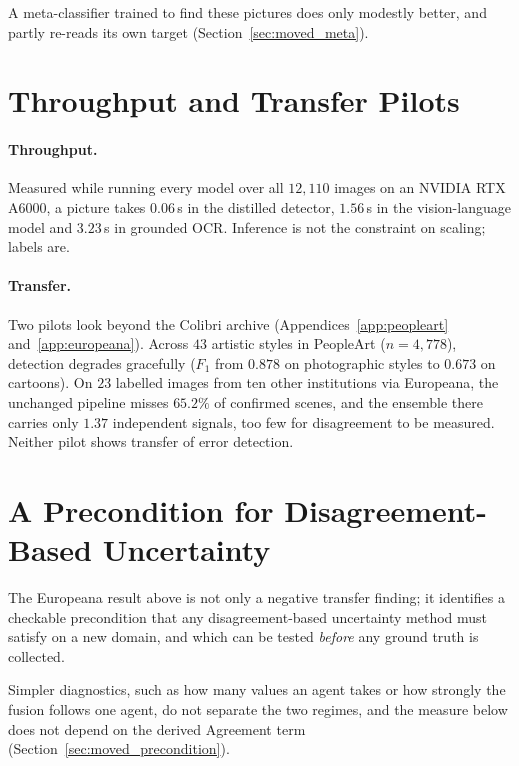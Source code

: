 \documentclass[12pt,a4paper]{report}
\begin{document}
A meta-classifier trained to find these pictures does only modestly better, and partly re-reads its own target (Section~\ref{sec:moved_meta}).

\section{Throughput and Transfer Pilots}
\label{sec:throughput_transfer}
\paragraph{Throughput.} Measured while running every model over all $12{,}110$ images on an NVIDIA RTX A6000, a picture takes $0.06$\,s in the distilled detector, $1.56$\,s in the vision-language model and $3.23$\,s in grounded OCR. Inference is not the constraint on scaling; labels are.

\paragraph{Transfer.} Two pilots look beyond the Colibri archive (Appendices~\ref{app:peopleart} and~\ref{app:europeana}). Across $43$ artistic styles in PeopleArt ($n=4{,}778$), detection degrades gracefully ($F_1$ from $0.878$ on photographic styles to $0.673$ on cartoons). On $23$ labelled images from ten other institutions via Europeana, the unchanged pipeline misses $65.2\%$ of confirmed scenes, and the ensemble there carries only $1.37$ independent signals, too few for disagreement to be measured. Neither pilot shows transfer of error detection.

\section{A Precondition for Disagreement-Based Uncertainty}
\label{sec:heterogeneity_precondition}
The Europeana result above is not only a negative transfer finding; it identifies a checkable precondition that any disagreement-based uncertainty method must satisfy on a new domain, and which can be tested \emph{before} any ground truth is collected.

Simpler diagnostics, such as how many values an agent takes or how strongly the fusion follows one agent, do not separate the two regimes, and the measure below does not depend on the derived Agreement term (Section~\ref{sec:moved_precondition}).
\end{document}
